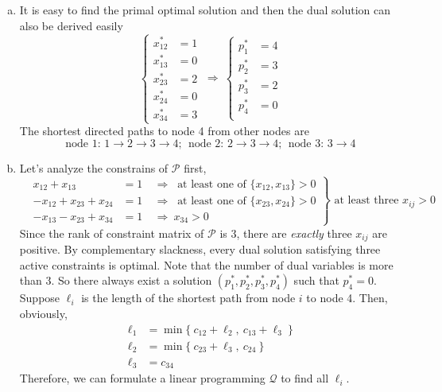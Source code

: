 \begin{enumerate}
\begin{enumerate}[(a)]
	\item It is easy to find the primal optimal solution and then the dual solution can also be derived easily
	\[
	\left\{ 
	\begin{aligned}
	x_{12}^* &= 1\\
	x_{13}^* &= 0\\
	x_{23}^* &= 2\\
	x_{24}^* &= 0\\
	x_{34}^* &= 3
	\end{aligned}
	\right.  ~\Rightarrow~ \left\{ 
	\begin{aligned}
	p_{1}^* &= 4\\
	p_{2}^* &= 3\\
	p_{3}^* &= 2\\
	p_{4}^* &= 0\\
	\end{aligned}
	\right.
	\]
	The shortest directed paths to node 4 from other nodes are
	\[
	\text{node 1: }1 \rightarrow 2 \rightarrow 3 \rightarrow 4;~~\text{node 2: } 2 \rightarrow 3 \rightarrow 4;~~ \text{node 3: }3 \rightarrow 4
	\]
	\newpage 
	\item Let's analyze the constrains of $\mathcal{P}$ first,
	\[
	\left.\begin{aligned}
	&x_{12} + x_{13}  &= 1&~\Rightarrow~\text{ at least one of } \{x_{12}, x_{13}\} > 0\\
	&-x_{12} + x_{23} + x_{24} &= 1& ~\Rightarrow~ \text{ at least one of } \{x_{23}, x_{24}\} > 0\\
	&-x_{13}-x_{23}+ x_{34}& =1& ~\Rightarrow~ x_{34} > 0 
	\end{aligned}\right\} \text{ at least three }x_{ij} > 0
	\] 
	Since the rank of constraint matrix of $\mathcal{P}$ is 3, there are \textit{exactly} three $x_{ij}$ are positive. By complementary slackness, every dual solution satisfying three active constraints is optimal. Note that the number of dual variables is more than $3$. So there always exist a solution $(p_1^*, p_2^*, p_3^*, p_4^*)$ such that $p_4^* = 0$. \\	Suppose $\ell_i$ is the length of the shortest path from node $i$ to node 4. Then, obviously,
	\[
	\begin{aligned}
	\ell_1 &= \min\{~c_{12}+\ell_2, ~c_{13}+\ell_3 ~\}\\
	\ell_2 &= \min\{~c_{23}+\ell_3, ~c_{24} ~\}\\
	\ell_3 &= c_{34}
	\end{aligned}
	\]
	Therefore, we can formulate a linear programming $\mathcal{Q}$ to find all $\ell_i$. 

\end{enumerate}
\end{enumerate}
